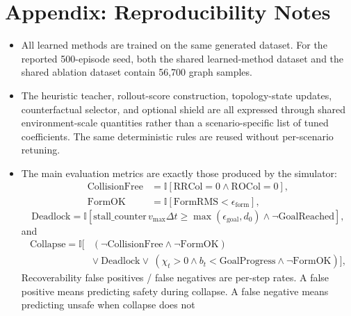 \documentclass{ieeeaccess}
\begin{document}
\section*{Appendix: Reproducibility Notes}
\begingroup\scriptsize
\begin{itemize}
    \item All learned methods are trained on the same generated dataset.
    For the reported 500-episode seed, both the
    shared learned-method dataset and the shared ablation dataset
    contain 56{,}700 graph samples.
    \item The heuristic teacher, rollout-score construction,
    topology-state updates, counterfactual selector, and optional shield
    are all expressed through shared environment-scale quantities rather
    than a scenario-specific list of tuned coefficients. The same
    deterministic rules are reused without per-scenario retuning.
    \item The main evaluation metrics are exactly those produced by the
    simulator:
    \begingroup\scriptsize
    \begin{equation*}
    \begin{aligned}
    \mathrm{CollisionFree}
    &= \mathbb{I}[\mathrm{RRCol}=0 \wedge \mathrm{ROCol}=0], \\
	    \mathrm{FormOK}
	    &= \mathbb{I}[\mathrm{FormRMS}<\epsilon_{\mathrm{form}}],
	    \end{aligned}
	    \end{equation*}
	    \begingroup\tiny
	    \begin{equation*}
	    \mathrm{Deadlock}
	    = \mathbb{I}\!\left[
	    \mathrm{stall\_counter}\, v_{\max}\Delta t
    \ge \max(\epsilon_{\mathrm{goal}}, d_0)
    \wedge \neg \mathrm{GoalReached}
    \right],
    \end{equation*}
    and
    \begin{equation*}
    \begin{aligned}
    \mathrm{Collapse}
    = \mathbb{I}\bigl[
    &(\neg \mathrm{CollisionFree}
      \wedge \neg \mathrm{FormOK})
      \\
	    &\vee\ \mathrm{Deadlock}
	      \vee\ (\chi_t>0 \wedge b_t<\mathrm{GoalProgress}
	      \wedge \neg \mathrm{FormOK})
	    \bigr],
	    \end{aligned}
	    \end{equation*}
	    \endgroup
	    \endgroup
    Recoverability false positives / false negatives are per-step
    rates. A false positive means predicting safety during collapse. A
    false negative means predicting unsafe when collapse does not

\end{itemize}
\end{document}
